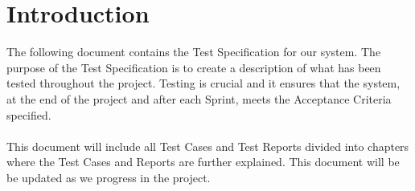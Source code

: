 \section{Introduction}
The following document contains the Test Specification for our system. The purpose of the Test Specification is to create a description of what has been tested throughout the project. Testing is crucial and it ensures that the system, at the end of the project and after each Sprint, meets the Acceptance Criteria specified.\\
\\
This document will include all Test Cases and Test Reports divided into chapters where the Test Cases and Reports are further explained. This document will be be updated as we progress in the project.